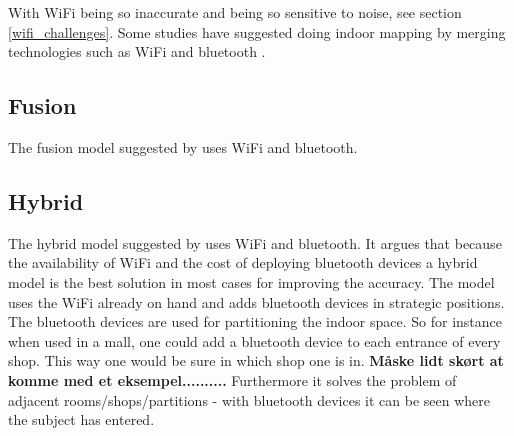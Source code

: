With WiFi being so inaccurate and being so sensitive to noise, see section \ref{wifi_challenges}.
Some studies have suggested doing indoor mapping by merging technologies such as WiFi and bluetooth \cite{hybrid_wifi_bluetooth} \cite{fusion_wifi_bluetooth}.

\subsection{Fusion}
The fusion model suggested by \citet{fusion_wifi_bluetooth} uses WiFi and bluetooth.


\subsection{Hybrid}
The hybrid model suggested by \citet{hybrid_wifi_bluetooth} uses WiFi and bluetooth.
It argues that because the availability of WiFi and the cost of deploying bluetooth devices a hybrid model is the best solution in most cases for improving the accuracy.
The model uses the WiFi already on hand and adds bluetooth devices in strategic positions.
The bluetooth devices are used for partitioning the indoor space.
So for instance when used in a mall, one could add a bluetooth device to each entrance of every shop.
This way one would be sure in which shop one is in.
\textbf{Måske lidt skørt at komme med et eksempel..........}
Furthermore it solves the problem of adjacent rooms/shops/partitions - with bluetooth devices it can be seen where the subject has entered.